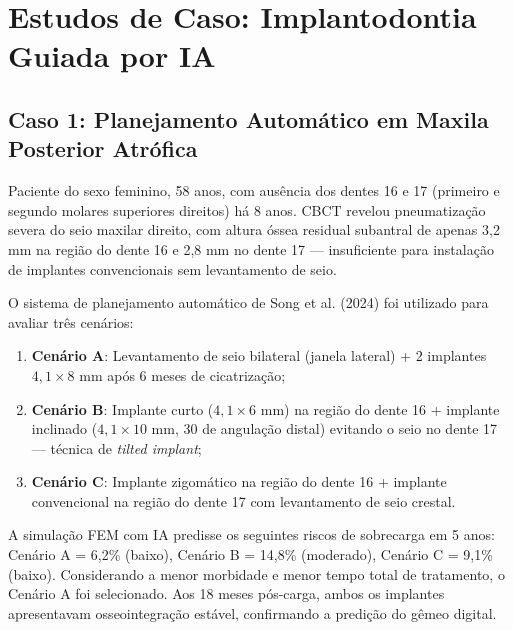 \section{Estudos de Caso: Implantodontia Guiada por IA}

\subsection{Caso 1: Planejamento Automático em Maxila Posterior Atrófica}

Paciente do sexo feminino, 58 anos, com ausência dos dentes 16 e 17 (primeiro e segundo molares superiores direitos) há 8 anos. CBCT revelou pneumatização severa do seio maxilar direito, com altura óssea residual subantral de apenas 3,2 mm na região do dente 16 e 2,8 mm no dente 17 --- insuficiente para instalação de implantes convencionais sem levantamento de seio.

O sistema de planejamento automático de Song et al. (2024) foi utilizado para avaliar três cenários:
\begin{enumerate}
    \item \textbf{Cenário A}: Levantamento de seio bilateral (janela lateral) + 2 implantes $4,1 \times 8$ mm após 6 meses de cicatrização;
    \item \textbf{Cenário B}: Implante curto ($4,1 \times 6$ mm) na região do dente 16 + implante inclinado ($4,1 \times 10$ mm, 30\textdegree{} de angulação distal) evitando o seio no dente 17 --- técnica de \textit{tilted implant};
    \item \textbf{Cenário C}: Implante zigomático na região do dente 16 + implante convencional na região do dente 17 com levantamento de seio crestal.
\end{enumerate}

A simulação FEM com IA predisse os seguintes riscos de sobrecarga em 5 anos: Cenário A = 6,2\% (baixo), Cenário B = 14,8\% (moderado), Cenário C = 9,1\% (baixo). Considerando a menor morbidade e menor tempo total de tratamento, o Cenário A foi selecionado. Aos 18 meses pós-carga, ambos os implantes apresentavam osseointegração estável, confirmando a predição do gêmeo digital.


